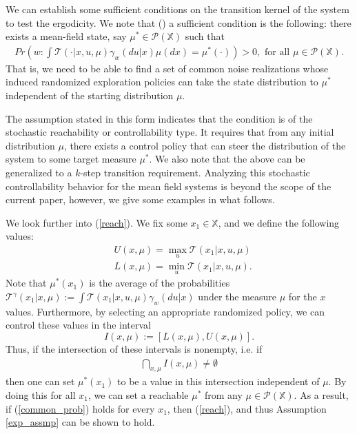 \documentclass[twoside,11pt]{article}
\def\P{{\mathcal P}}
\begin{document}
\begin{remark}
We can establish some sufficient conditions on the transition kernel of the system to test the ergodicity. We note that (\cite[p 56, 3.1.1]{hernandez2012adaptive}) a sufficient condition is the following: there exists a mean-field state, say $\mu^*\in\P(\mathds{X})$ such that
\begin{align}\label{reach}
Pr\left( w:\int \mathcal{T}(\cdot|x,u,\mu)\gamma_w(du|x)\mu(dx)=\mu^*(\cdot)  \right)>0, \text{ for all } \mu \in\P(\mathds{X}).
\end{align}
That is, we need to be able to find a set of common noise realizations whose induced randomized exploration policies can take the state distribution to $\mu^*$ independent of the starting distribution $\mu$.

The assumption stated in this form indicates that the condition is of the stochastic reachability or controllability type. It requires that from any initial distribution $\mu$, there exists a control policy that can steer the distribution of the system to some target measure $\mu^*$. We also note that the above can be generalized to a $k$-step transition requirement. Analyzing this stochastic controllability behavior for the mean field systems is beyond the scope of the current paper, however, we give some examples in what follows.

We look further into (\ref{reach}). We fix some $x_1\in\mathds{X}$, and we define the following values:
\begin{align*}
&U(x,\mu) = \max_u\mathcal{T}(x_1|x,u,\mu)\\
&L(x,\mu) = \min_u\mathcal{T}(x_1|x,u,\mu).
\end{align*}
Note that $\mu^*(x_1)$ is the average of the probabilities $\mathcal{T}^\gamma(x_1|x,\mu):=\int\mathcal{T}(x_1|x,u,\mu)\gamma_w(du|x)$ under the measure $\mu$ for the $x$ values. Furthermore, by selecting an appropriate randomized policy, we can control these values in the interval $$I(x,\mu):=\left[L(x,\mu),U(x,\mu)\right].$$ Thus, if the intersection of these intervals is nonempty, i.e. if
\begin{align}\label{common_prob}
\bigcap_{x,\mu}I(x,\mu)\neq\emptyset
\end{align}
then one can set $\mu^*(x_1)$ to be a value in this intersection independent of $\mu$. By doing this for all $x_1$, we can set a reachable $\mu^*$ from any $\mu\in\P(\mathds{X})$. As a result, if (\ref{common_prob}) holds for every $x_1$, then (\ref{reach}), and thus Assumption \ref{exp_assmp} can be shown to hold.


\end{remark}
\end{document}

